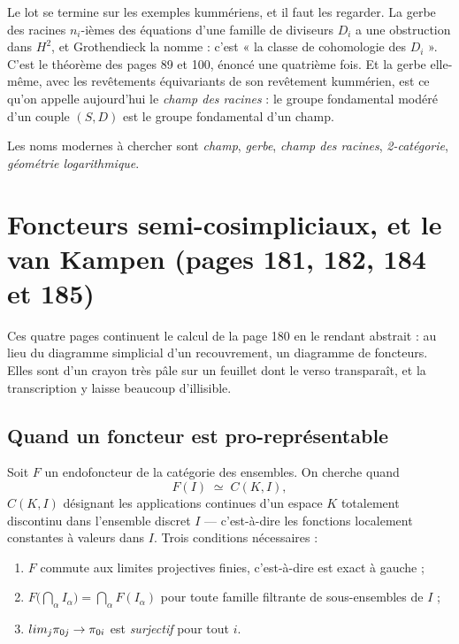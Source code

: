 \documentclass[11pt,a4paper]{article}
\begin{document}
\begin{resume}
Le lot se termine sur les exemples kummériens, et il faut les regarder. La
gerbe des racines $n_{i}$-ièmes des équations d'une famille de diviseurs
$D_{i}$ a une obstruction dans $H^{2}$, et Grothendieck la nomme : c'est « la
classe de cohomologie des $D_{i}$ ». C'est le théorème des pages 89 et 100,
énoncé une quatrième fois. Et la gerbe elle-même, avec les revêtements
équivariants de son revêtement kummérien, est ce qu'on appelle aujourd'hui le
\emph{champ des racines} : le groupe fondamental modéré d'un couple $(S, D)$
est le groupe fondamental d'un champ.

Les noms modernes à chercher sont \emph{champ}, \emph{gerbe}, \emph{champ des
racines}, \emph{2-catégorie}, \emph{géométrie logarithmique}.

\end{resume}

\section*{Foncteurs semi-cosimpliciaux, et le van Kampen (pages 181, 182, 184 et 185)}

Ces quatre pages continuent le calcul de la page 180 en le rendant abstrait :
au lieu du diagramme simplicial d'un recouvrement, un diagramme de foncteurs.
Elles sont d'un crayon très pâle sur un feuillet dont le verso transparaît, et
la transcription y laisse beaucoup d'illisible.

\subsection*{Quand un foncteur est pro-représentable}

Soit $F$ un endofoncteur de la catégorie des ensembles. On cherche quand
\[
  F(I) \;\simeq\; C(K, I) ,
\]
$C(K,I)$ désignant les applications continues d'un espace $K$ totalement
discontinu dans l'ensemble discret $I$ --- c'est-à-dire les fonctions
localement constantes à valeurs dans $I$. Trois conditions nécessaires :

\begin{enumerate}
  \item[a)] $F$ commute aux limites projectives finies, c'est-à-dire est exact
    à gauche ;
  \item[b)] $F\bigl(\bigcap_{\alpha} I_{\alpha}\bigr) =
    \bigcap_{\alpha} F(I_{\alpha})$ pour toute famille filtrante de
    sous-ensembles de $I$ ;
  \item[c)] $\varprojlim_{j} \pi_{0j} \to \pi_{0i}$ est \emph{surjectif} pour
    tout $i$.
\end{enumerate}
\end{document}
